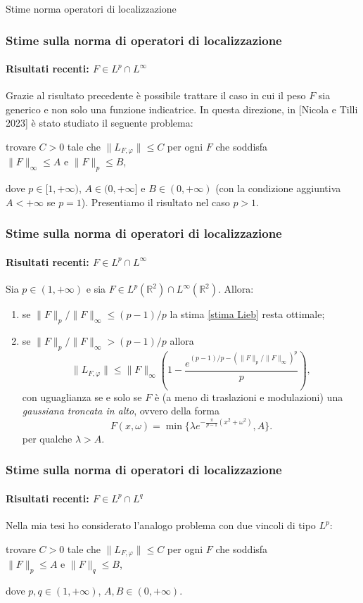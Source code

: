 \documentclass[aspectratio=141]{beamer}
\newcommand{\R}{\mathbb{R}} %
\begin{document}
\begin{section}{Stime norma operatori di localizzazione}
	\begin{frame}
		\frametitle{Stime sulla norma di operatori di localizzazione}
		\framesubtitle{Risultati recenti: $F \in L^p \cap L^{\infty}$}
		Grazie al risultato precedente è possibile trattare il caso in cui il peso $F$ sia generico e non solo una funzione indicatrice. In questa direzione, in [Nicola e Tilli 2023] è stato studiato il seguente problema:
		\begin{center}
			trovare $C>0$ tale che $\|L_{F,\varphi}\| \leq C$ per ogni $F$ che soddisfa\\
			$\|F\|_{\infty} \leq A$ e $\|F\|_{p} \leq B$,			
		\end{center}
		dove $p \in [1,+\infty)$, $A \in (0, +\infty]$ e $B \in (0, +\infty)$ (con la condizione aggiuntiva $A<+\infty$ se $p=1$). Presentiamo il risultato nel caso $p>1$.
	\end{frame}

	\begin{frame}
		\frametitle{Stime sulla norma di operatori di localizzazione}
		\framesubtitle{Risultati recenti: $F \in L^p \cap L^{\infty}$}
		\begin{myblock}
			Sia $p \in (1, +\infty)$ e sia $F \in L^p(\R^2) \cap L^{\infty}(\R^2)$. Allora:
			\begin{enumerate}
				\item se $\|F\|_p / \|F\|_{\infty}  \leq (p-1)/p$ la stima \eqref{stima Lieb} resta ottimale;
				\pause
				\item se $\|F\|_p / \|F\|_{\infty} > (p-1)/p$ allora
				\begin{equation*}
					\|L_{F,\varphi}\| \leq \|F\|_{\infty} \left(1 - \dfrac{e^{(p-1)/p - (\|F\|_p / \|F\|_{\infty})^p}}{p}\right),
				\end{equation*}
				con uguaglianza se e solo se $F$ è (a meno di traslazioni e modulazioni) una \emph{gaussiana troncata in alto}, ovvero della forma
				\begin{equation*}
					F(x,\omega) = \min \{\lambda e^{-\frac{\pi}{p-1}(x^2 + \omega^2)}, A\}.
				\end{equation*}
				per qualche $\lambda > A$.
			\end{enumerate}
		\end{myblock}
	\end{frame}


	\begin{frame}
		\frametitle{Stime sulla norma di operatori di localizzazione}
		\framesubtitle{Risultati recenti: $F \in L^p \cap L^q$}
		Nella mia tesi ho considerato l'analogo problema con due vincoli di tipo $L^p$:
		\begin{center}
			trovare $C>0$ tale che $\|L_{F,\varphi}\| \leq C$ per ogni $F$ che soddisfa\\
			$\|F\|_{p} \leq A$ e $\|F\|_{q} \leq B$,			
		\end{center}
		dove $p, q \in (1,+\infty)$, $A,B \in (0, +\infty)$.
	\end{frame}


\end{section}
\end{document}
